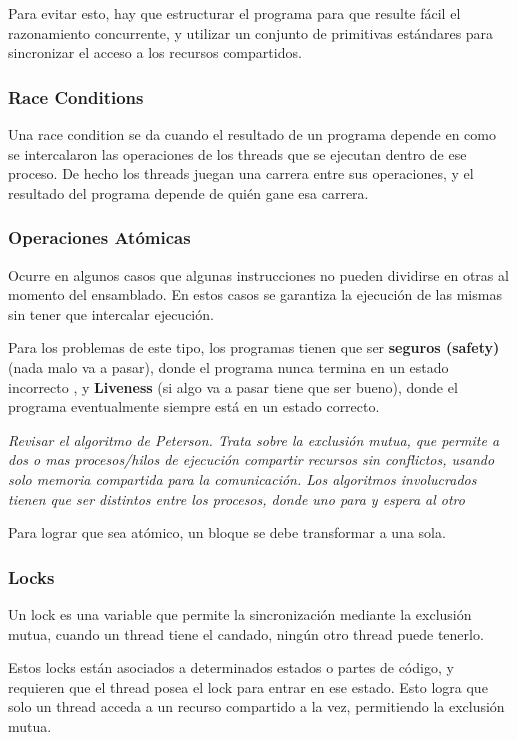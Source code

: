 \documentclass[titlepage,a4paper]{article}
\begin{document}
Para evitar esto, hay que estructurar el programa para que resulte fácil el razonamiento concurrente, y utilizar un conjunto de primitivas estándares para sincronizar el acceso a los recursos compartidos.

\subsubsection*{Race Conditions}

Una race condition se da cuando el resultado de un programa depende en como se intercalaron las operaciones de los threads que se ejecutan dentro de ese proceso. De hecho los threads juegan una carrera entre sus operaciones, y el resultado del programa depende de quién gane esa carrera.


\subsubsection*{Operaciones Atómicas}
Ocurre en algunos casos que algunas instrucciones no pueden dividirse en otras al momento del ensamblado. En estos casos se garantiza la ejecución de las mismas sin tener que intercalar ejecución.

Para los problemas de este tipo, los programas tienen que ser \textbf{seguros (safety)} (nada malo va a pasar), donde el programa nunca termina en un estado incorrecto , y 
\textbf{Liveness} (si algo va a pasar tiene que ser bueno), donde el programa eventualmente siempre está en un estado correcto.

\textit{Revisar el algoritmo de Peterson. Trata sobre la exclusión mutua, que permite a dos o mas procesos/hilos de ejecución compartir recursos sin conflictos, usando solo memoria compartida para la comunicación. Los algoritmos involucrados tienen que ser distintos entre los procesos, donde uno para y espera al otro}

Para lograr que sea atómico, un bloque se debe transformar a una sola.

\subsubsection*{Locks}
Un lock es una variable que permite la sincronización mediante la exclusión mutua, cuando un thread tiene el candado, ningún otro thread puede tenerlo.

Estos locks están asociados a determinados estados o partes de código, y requieren que el thread posea el lock para entrar en ese estado. Esto logra que solo un thread acceda a un recurso compartido a la vez, permitiendo la exclusión mutua.
\end{document}

